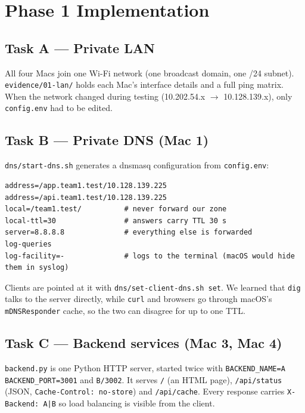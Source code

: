 \documentclass[11pt,a4paper]{article}
\newcommand{\cmd}[1]{\texttt{#1}}
\begin{document}
\section{Phase 1 Implementation}

\subsection{Task A --- Private LAN}
All four Macs join one Wi-Fi network (one broadcast domain, one /24 subnet).
\cmd{evidence/01-lan/} holds each Mac's interface details and a full ping
matrix. When the network changed during testing (10.202.54.x $\to$
10.128.139.x), only \cmd{config.env} had to be edited.

\subsection{Task B --- Private DNS (Mac 1)}
\cmd{dns/start-dns.sh} generates a dnsmasq configuration from
\cmd{config.env}:
\begin{lstlisting}
address=/app.team1.test/10.128.139.225
address=/api.team1.test/10.128.139.225
local=/team1.test/          # never forward our zone
local-ttl=30                # answers carry TTL 30 s
server=8.8.8.8              # everything else is forwarded
log-queries
log-facility=-              # logs to the terminal (macOS would hide them in syslog)
\end{lstlisting}
Clients are pointed at it with \cmd{dns/set-client-dns.sh set}. We learned
that \cmd{dig} talks to the server directly, while \cmd{curl} and browsers go
through macOS's \cmd{mDNSResponder} cache, so the two can disagree for up to
one TTL.

\subsection{Task C --- Backend services (Mac 3, Mac 4)}
\cmd{backend.py} is one Python HTTP server, started twice with
\cmd{BACKEND\_NAME=A BACKEND\_PORT=3001} and \cmd{B/3002}. It serves
\cmd{/} (an HTML page), \cmd{/api/status} (JSON, \cmd{Cache-Control: no-store})
and \cmd{/api/cache}. Every response carries \cmd{X-Backend: A|B} so load
balancing is visible from the client.
\end{document}
